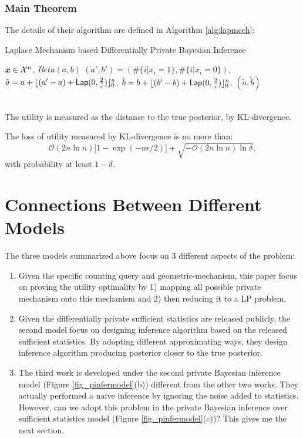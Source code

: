 \documentclass{article}
\begin{document}
\subsubsection{Main Theorem}
The details of their algorithm are defined in Algorithm \ref{alg:lapmech}:
%
\begin{algorithm}
  \caption{Laplace Mechanism based Differentially Private Bayesian Inference}
  \label{alg:lapmech}
  \begin{algorithmic}
  \STATE $\boldsymbol{x}\in\mathcal{X}^n$, $Beta(a, b)$
  \STATE {} $(a', b') = (\#\{i | x_i = 1\}, \#\{i | x_i = 0\})$, 
  \STATE {} $\tilde{a} = a + \lfloor{(a' - a)+ \mathsf{Lap}(0, \frac{2}{\epsilon}) }\rfloor^n_0$,
  $\tilde{b} = b + \lfloor{(b' - b)+ \mathsf{Lap}(0, \frac{2}{\epsilon}) }\rfloor^n_0$.
   $(\tilde{a}, \tilde{b})$
  \end{algorithmic}
\end{algorithm}
%
\\
The utility is measured as the distance to the true posterior, by KL-divergence. 
\begin{thm}
The loss of utility measured by KL-divergence is no more than:
\[
	\mathcal{O}(2n\ln n)\big[ 1 - \exp(-n\epsilon / 2) \big] + \sqrt{-\mathcal{O}(2 n \ln n) \ln \delta},
\]
with probability at least $1 - \delta$.
\end{thm}
%
%
\section{Connections Between Different Models}
The three models summarized above focus on 3 different aspects of the problem:
\begin{enumerate} 
\item Given the specific counting query and geometric-mechanism, this paper focus on proving the utility optimality by 
1) mapping all possible private mechanism onto this mechanism and 2) then reducing it to a LP problem.
%
\item Given the differentially private sufficient statistics are released publicly, 
the second model focus on designing inference algorithm based on the released sufficient statistics. 
By adopting different approximating ways, they design inference algorithm producing posterior closer to the true posterior.
%
\item The third work is developed under the second private Bayesian inference model (Figure \ref{fig_pinfermodel}(b)) different from the other two works.
They actually performed a naive inference by ignoring the noise added to statistics.
However, can we adopt this problem in the private Bayesian inference over sufficient statistics model (Figure \ref{fig_pinfermodel}(c))?
This gives me the next section.
\end{enumerate}
\end{document}

